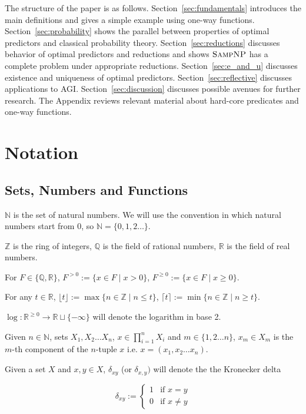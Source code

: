 \documentclass{article}
\numberwithin{equation}{section}
\theoremstyle{definition}
\theoremstyle{plain}
\newcommand{\Nats}{\mathbb{N}}
\newcommand{\Ints}{\mathbb{Z}}
\newcommand{\Rats}{\mathbb{Q}}
\newcommand{\Reals}{\mathbb{R}}
\newcommand{\Floor}[1]{\lfloor #1 \rfloor}
\newcommand{\Ceil}[1]{\lceil #1 \rceil}
\begin{document}
The structure of the paper is as follows. Section~\ref{sec:fundamentals} introduces the main definitions and gives a simple example using one-way functions. Section~\ref{sec:probability} shows the parallel between properties of optimal predictors and classical probability theory. Section~\ref{sec:reductions} discusses behavior of optimal predictors and reductions and shows $\textsc{SampNP}$ has a complete problem under appropriate reductions. Section~\ref{sec:e_and_u} discusses existence and uniqueness of optimal predictors. Section~\ref{sec:reflective} discusses applications to AGI. Section~\ref{sec:discussion} discusses possible avenues for further research. The Appendix reviews relevant material about hard-core predicates and one-way functions.

\setcounter{section}{-1}

\section{Notation}
%
\subsection{Sets, Numbers and Functions}

$\Nats$ is the set of natural numbers. We will use the convention in which natural numbers start from 0, so $\Nats = \{0, 1, 2 \ldots \}$. 

$\Ints$ is the ring of integers, $\Rats$ is the field of rational numbers, $\Reals$ is the field of real numbers.

For $F \in \{\Rats,\Reals\}$, $F^{>0} := \{x \in F \mid x > 0\}$, $F^{\geq 0} := \{x \in F \mid x \geq 0\}$.

For any $t \in \Reals$, $\Floor{t} := \max \{n \in \Ints \mid n \leq t\}$, $\Ceil{t} := \min \{n \in \Ints \mid n \geq t\}$.

$\log: \Reals^{\geq 0} \rightarrow \Reals \sqcup \{-\infty\}$ will denote the logarithm in base 2.

Given $n \in \Nats$, sets $X_1, X_2 \ldots X_n$, $x \in \prod_{i=1}^n X_i$ and $m \in \{1,2 \ldots n\}$, $x_m \in X_m$ is the $m$-th component of the $n$-tuple $x$ i.e. $x=(x_1, x_2 \ldots x_n)$.

Given a set $X$ and $x,y \in X$, $\delta_{xy}$ (or $\delta_{x,y})$ will denote the the Kronecker delta

$$\delta_{xy} := \begin{cases}1 & \text{if } x=y \\ 0 & \text{if } x \ne y \end{cases}$$
\end{document}
